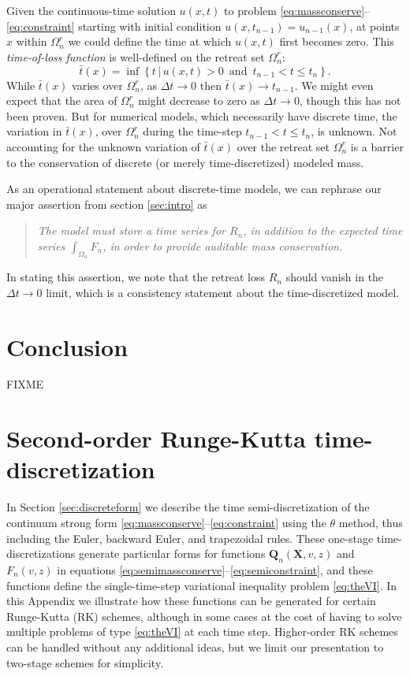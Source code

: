 \documentclass[final,leqno,onefignum,onetabnum]{siamltex1213bueler}
\newcommand\bQ{\mathbf{Q}}
\newcommand\bX{\mathbf{X}}
\begin{document}
Given the continuous-time solution $u(x,t)$ to problem \eqref{eq:massconserve}--\eqref{eq:constraint} starting with initial condition $u(x,t_{n-1}) = u_{n-1}(x)$, at points $x$ within $\Omega_n^r$ we could define the time at which $u(x,t)$ first becomes zero.  This \emph{time-of-loss function} is well-defined on the retreat set $\Omega_n^r$:
\begin{equation}
\bar t(x) = \inf\left\{t \,\big|\, u(x,t)>0 \,\text{ and }\, t_{n-1} < t \le t_n\right\}.
\end{equation}
While $\bar t(x)$ varies over $\Omega_n^r$, as $\Delta t \to 0$ then $\bar t(x) \to t_{n-1}$.  We might even expect that the area of $\Omega_n^r$ might decrease to zero as $\Delta t \to 0$, though this has not been proven.  But for numerical models, which necessarily have discrete time, the variation in $\bar t(x)$, over $\Omega_n^r$ during the time-step $t_{n-1} < t \le t_n$, is unknown.  Not accounting for the unknown variation of $\bar t(x)$ over the retreat set $\Omega_n^r$ is a barrier to the conservation of discrete (or merely time-discretized) modeled mass.

As an operational statement about discrete-time models, we can rephrase our major assertion from section \ref{sec:intro} as
\begin{quote}
\emph{The model must store a time series for $R_n$, in addition to the expected time series $\int_{\Omega_n} F_n$, in order to provide auditable mass conservation.}
\end{quote}
In stating this assertion, we note that the retreat loss $R_n$ should vanish in the $\Delta t\to 0$ limit, which is a consistency statement about the time-discretized model.


\section{Conclusion} \label{sec:conclusion}  FIXME






\appendix

\section{Second-order Runge-Kutta time-discretization}   In Section \ref{sec:discreteform} we describe the time semi-discretization of the continuum strong form \eqref{eq:massconserve}--\eqref{eq:constraint} using the $\theta$ method, thus including the Euler, backward Euler, and trapezoidal rules.  These one-stage time-discretizations generate particular forms for functions $\bQ_n(\bX,v,z)$ and $F_n(v,z)$ in equations \eqref{eq:semimassconserve}--\eqref{eq:semiconstraint}, and these functions define the single-time-step variational inequality problem \eqref{eq:theVI}.  In this Appendix we illustrate how these functions can be generated for certain Runge-Kutta (RK) schemes, although in some cases at the cost of having to solve multiple problems of type \eqref{eq:theVI} at each time step.  Higher-order RK schemes can be handled without any additional ideas, but we limit our presentation to two-stage schemes for simplicity.
\end{document}
